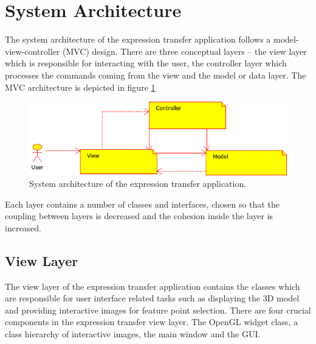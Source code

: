 \documentclass[11pt,a4paper]{report}
\begin{document}
\section{System Architecture}
The system architecture of the expression transfer application follows a
model-view-controller (MVC) design. There are three conceptual layers -- the
view layer which is responsible for interacting with the user, the controller
layer which processes the commands coming from the view and the model or data
layer. The MVC architecture is depicted in figure \ref{fg:mvc} 

\begin{figure}[H]
\begin{centering}
\includegraphics[scale=0.75]{images/mvc.png}
\par\end{centering}

\caption{System architecture of the expression transfer application.}
\label{fg:mvc}
\end{figure}

Each layer contains a number of classes and interfaces, chosen so that the coupling
between layers is decreased and the cohesion inside the layer is increased. 

\subsection{View Layer}
The view layer of the expression transfer application contains the classes which
are responsible for user interface related tasks such as displaying the 3D model
and providing interactive images for feature point selection. There are four
crucial components in the expression transfer view layer. The
OpenGL widget class, a class hierarchy of interactive images, the main
window and the GUI.
\end{document}
